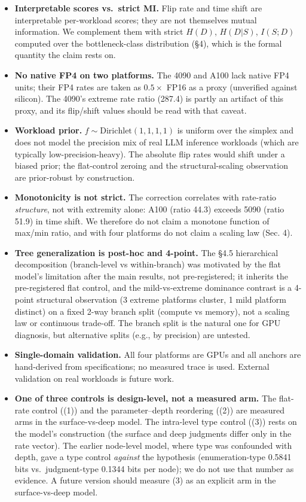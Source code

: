 {{{{\begin{itemize}
\tightlist
\item
  \textbf{Interpretable scores vs.~strict MI.} Flip rate and time shift are interpretable per-workload scores; they are not themselves mutual information. We complement them with strict \(H(D)\), \(H(D|S)\), \(I(S;D)\) computed over the bottleneck-class distribution (§4), which is the formal quantity the claim rests on.
\item
  \textbf{No native FP4 on two platforms.} The 4090 and A100 lack native FP4 units; their FP4 rates are taken as \(0.5 \times\) FP16 as a proxy (unverified against silicon). The 4090's extreme rate ratio (287.4) is partly an artifact of this proxy, and its flip/shift values should be read with that caveat.
\item
  \textbf{Workload prior.} \(f \sim \text{Dirichlet}(1,1,1,1)\) is uniform over the simplex and does not model the precision mix of real LLM inference workloads (which are typically low-precision-heavy). The absolute flip rates would shift under a biased prior; the flat-control zeroing and the structural-scaling observation are prior-robust by construction.
\item
  \textbf{Monotonicity is not strict.} The correction correlates with rate-ratio \emph{structure}, not with extremity alone: A100 (ratio 44.3) exceeds 5090 (ratio 51.9) in time shift. We therefore do not claim a monotone function of max/min ratio, and with four platforms do not claim a scaling law (Sec. 4).
\item
  \textbf{Tree generalization is post-hoc and 4-point.} The §4.5 hierarchical decomposition (branch-level vs within-branch) was motivated by the flat model's limitation after the main results, not pre-registered; it inherits the pre-registered flat control, and the mild-vs-extreme dominance contrast is a 4-point structural observation (3 extreme platforms cluster, 1 mild platform distinct) on a fixed 2-way branch split (compute vs memory), not a scaling law or continuous trade-off. The branch split is the natural one for GPU diagnosis, but alternative splits (e.g., by precision) are untested.
\item
  \textbf{Single-domain validation.} All four platforms are GPUs and all anchors are hand-derived from specifications; no measured trace is used. External validation on real workloads is future work.
\item
  \textbf{One of three controls is design-level, not a measured arm.} The flat-rate control ((1)) and the parameter--depth reordering ((2)) are measured arms in the surface-vs-deep model. The intra-level type control ((3)) rests on the model's construction (the surface and deep judgments differ only in the rate vector). The earlier node-level model, where type was confounded with depth, gave a type control \emph{against} the hypothesis (enumeration-type 0.5841 bits vs.~judgment-type 0.1344 bits per node); we do not use that number as evidence. A future version should measure (3) as an explicit arm in the surface-vs-deep model.
\end{itemize}

}}}}

